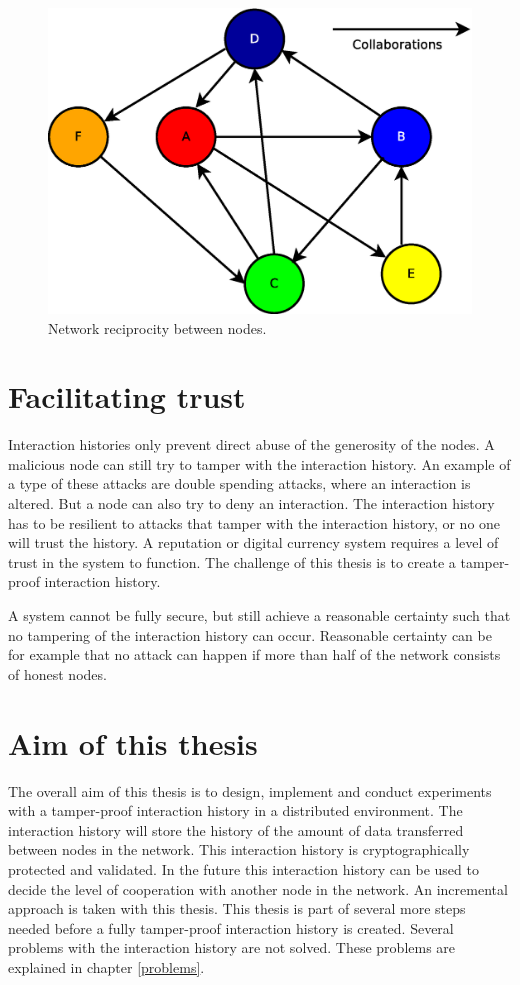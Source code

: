 \begin{figure}
	\centerline{\includegraphics[scale=0.3]{problemDescription/figs/network-reciprocity.eps}}
	\caption{Network reciprocity between nodes.}
	\label{fig:network-reciprocity}
\end{figure}

\section{Facilitating trust}
Interaction histories only prevent direct abuse of the generosity of the nodes.
A malicious node can still try to tamper with the interaction history.
An example of a type of these attacks are double spending attacks\cite{Nakamoto-bitcoin},
where an interaction is altered.
But a node can also try to deny an interaction.
The interaction history has to be resilient to attacks that tamper with the interaction history,
or no one will trust the history. 
A reputation or digital currency system requires a level of trust in the system to function.
The challenge of this thesis is to create a tamper-proof interaction history.

A system cannot be fully secure, 
but still achieve a reasonable certainty such that no tampering of the interaction history can occur.
Reasonable certainty can be for example that no attack can happen
if more than half of the network consists of honest nodes.

\section{Aim of this thesis}
\label{pb-aim}
The overall aim of this thesis is to design, implement and conduct experiments with a tamper-proof interaction history
in a distributed environment.
The interaction history will store the history of the amount of data transferred between nodes in the network.
This interaction history is cryptographically protected and validated.
In the future this interaction history can be used to decide the level of cooperation with another node in the network.
An incremental approach is taken with this thesis.
This thesis is part of several more steps needed before a fully tamper-proof interaction history is created.
Several problems with the interaction history are not solved.
These problems are explained in chapter \ref{problems}.
